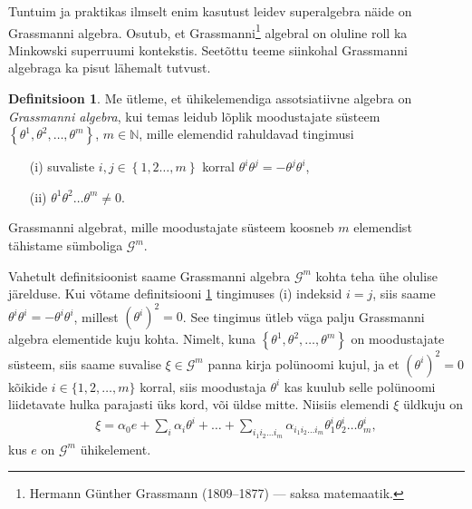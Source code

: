 \documentclass[12pt,a4paper,oneside]{article}
\theoremstyle{plain}
\theoremstyle{definition}
\newtheorem{definitsioon}{Definitsioon}[section]
\numberwithin{equation}{section}
\def\N{{\mathbb N}}
\def\G{{\mathcal G}}
\begin{document}
Tuntuim ja praktikas ilmselt enim kasutust leidev superalgebra näide 
on Grassmanni algebra. Osutub, et 
Grassmanni\footnote{Hermann Günther Grassmann (1809--1877) --- 
saksa matemaatik.} algebral on oluline roll ka Minkowski 
superruumi kontekstis. Seetõttu teeme siinkohal Grassmanni 
algebraga ka pisut lähemalt tutvust.

\begin{definitsioon} \label{def:grassmann}
Me ütleme, et ühikelemendiga assotsiatiivne algebra on 
\emph{Grassmanni algebra}, kui temas leidub lõplik moodustajate 
süsteem $\left\lbrace\theta^1, \theta^2, \ldots, 
\theta^m\right\rbrace$, $m \in \N$, mille elemendid rahuldavad 
tingimusi \begin{itemize}
\item[(i)] suvaliste $i, j \in \left\lbrace 1, 2 \ldots, 
m \right\rbrace$ korral $\theta^i \theta^j = - \theta^j \theta^i$,
\item[(ii)] $\theta^1 \theta^2 \ldots \theta^m \neq 0$.
\end{itemize}
Grassmanni algebrat, mille moodustajate süsteem koosneb $m$ 
elemendist tähistame sümboliga $\G^m$.
\end{definitsioon}

Vahetult definitsioonist saame Grassmanni algebra $\G^m$ kohta 
teha ühe olulise järelduse. Kui võtame definitsiooni 
\ref{def:grassmann} tingimuses (i) indeksid $i = j$, siis saame 
$\theta^i \theta^i = -\theta^i \theta^i$, millest
$\left(\theta^i\right)^2 = 0$. See tingimus ütleb väga palju 
Grassmanni algebra elementide kuju kohta. Nimelt, kuna 
$\left\lbrace\theta^1, \theta^2, \ldots, \theta^m\right\rbrace$ 
on moodustajate süsteem, siis saame suvalise $\xi \in \G^m$ 
panna kirja polünoomi kujul, ja et $\left(\theta^i\right)^2 = 0$ 
kõikide $i \in \{1, 2, \ldots, m\}$ korral, siis moodustaja 
$\theta^i$ kas kuulub selle polünoomi liidetavate hulka parajasti 
üks kord, või üldse mitte. Niisiis elemendi $\xi$ üldkuju on
\begin{align*}
\xi = \alpha_0 e + \sum_{i} \alpha_i \theta^i + \ldots + 
\sum_{i_1 i_2 \ldots i_m} \alpha_{i_1 i_2 \ldots i_m} 
\theta^i_1 \theta^i_2 \ldots \theta^i_m,
\end{align*}
kus $e$ on $\G^m$ ühikelement.
\end{document}
